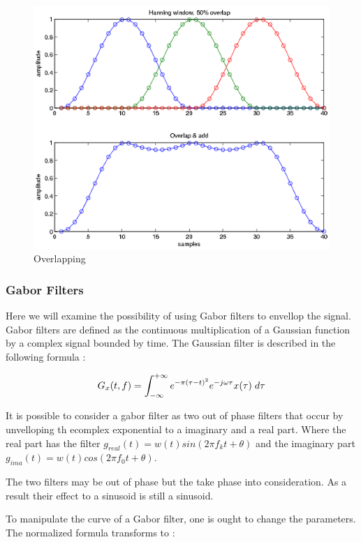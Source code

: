  
 
         \begin{figure}
            \centering
            \includegraphics[width = 0.5 \textwidth ]{Graphs/Overlapping.png}
            \caption{Overlapping}
            \label{overlapping}
        \end{figure}

\subsubsection{Gabor Filters}

Here we will examine the possibility of using Gabor filters to envellop the signal. Gabor filters are defined as the continuous multiplication of a Gaussian function by a complex signal bounded by time. The Gaussian filter is described in the following formula :


\begin{equation}
    G_x(t,f) = \int_{-\infty}^{+\infty} e ^ {-\pi(\tau-t)^2} e ^ {-j\omega \tau} x(\tau)\hspace{1mm} d\tau  
\end{equation}

It is possible to consider a gabor filter as two out of phase filters that occur by unvelloping th ecomplex exponential to a imaginary and a real part. Where the real part has the filter $g_{real}(t) = w(t) sin (2 \pi f_k t + \theta)$ and the imaginary part $g_{ima}(t) = w(t) cos (2 \pi f_0 t + \theta)$.

The two filters may be out of phase but the take phase into consideration. As a result their effect to a sinusoid is still a sinusoid.

To manipulate the curve of a Gabor filter, one is ought to change the parameters. The normalized formula transforms to :

